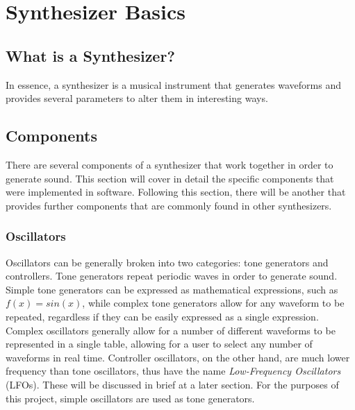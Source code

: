 \documentclass[12pt]{article}
\begin{document}
\section{Synthesizer Basics}

\subsection{What is a Synthesizer?}
In essence, a synthesizer is a musical instrument that generates waveforms and provides several parameters to alter them in interesting ways. 

\subsection{Components}
There are several components of a synthesizer that work together in order to generate sound. This section will cover in detail the specific components that were implemented in software. Following this section, there will be another that provides further components that are commonly found in other synthesizers.

\subsubsection{Oscillators}
Oscillators can be generally broken into two categories: tone generators and controllers. Tone generators repeat periodic waves in order to generate sound. Simple tone generators can be expressed as mathematical expressions, such as \(f(x) = sin(x)\), while complex tone generators allow for any waveform to be repeated, regardless if they can be easily expressed as a single expression. Complex oscillators generally allow for a number of different waveforms to be represented in a single table, allowing for a user to select any number of waveforms in real time. Controller oscillators, on the other hand, are much lower frequency than tone oscillators, thus have the name \textit{Low-Frequency Oscillators} (LFOs). These will be discussed in brief at a later section. For the purposes of this project, simple oscillators are used as tone generators.
\end{document}
